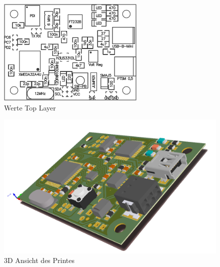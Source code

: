 \begin{figure}[H]
	\begin{minipage}[hbt]{7cm}
		\centering
		\includegraphics[width=7cm]{img/HW/comment.png}
		\caption{Werte Top Layer}
		\label{fig:BotVal}
	\end{minipage}
\end{figure}

\begin{figure}
	\centering
	\includegraphics[width=13cm]{img/HW/3d_w.png}
	\caption{3D Ansicht des Printes}
	\label{fig:3d}
\end{figure}
